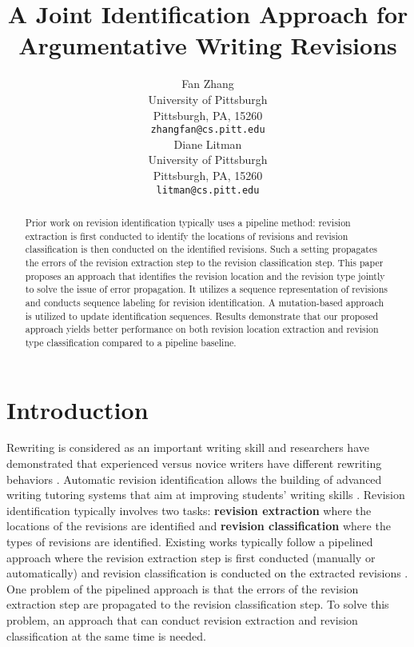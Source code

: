 \documentclass[11pt]{article}
\title{A Joint Identification Approach for Argumentative Writing Revisions}
\author{Fan Zhang \\
  University of Pittsburgh  \\
   Pittsburgh, PA, 15260 \\
  {\tt zhangfan@cs.pitt.edu} \\\And
  Diane Litman \\
  University of Pittsburgh  \\
   Pittsburgh, PA, 15260 \\
  {\tt litman@cs.pitt.edu} \\}
\date{}
\begin{document}
\maketitle
\begin{abstract}
 Prior work on revision identification typically uses a pipeline method: revision extraction is first conducted to identify the locations of revisions and revision classification is then conducted on the identified revisions. Such a setting propagates the errors of the revision extraction step to the revision classification step. This paper proposes an approach that identifies the revision location and the revision type jointly to solve the issue of error propagation. It utilizes a sequence representation of revisions and conducts sequence labeling for revision identification. A mutation-based approach is utilized to update identification sequences. Results demonstrate that our proposed approach yields better performance on both revision location extraction and revision type classification compared to a pipeline baseline. 
\end{abstract}

\section{Introduction}
\label{intro}

Rewriting is considered as an important writing skill and researchers have demonstrated that experienced versus novice writers have different rewriting behaviors \cite{faigley1981analyzing}. Automatic revision identification allows the building of advanced writing tutoring systems that aim at improving students' writing skills \cite{roscoe2015automated,zhang-EtAl:2016:N16-3}. Revision identification typically involves two tasks: \textbf{revision extraction} where the locations of the revisions are identified and \textbf{revision classification} where the types of revisions are identified. Existing works typically follow a pipelined approach where the revision extraction step is first conducted (manually or automatically) and revision classification is conducted on the extracted revisions \cite{adler2011wikipedia,daxenberger2013automatically,bronner2012user,zhang-litman:2015:bea}. One problem of the pipelined approach is that the errors of the revision extraction step are propagated to the revision classification step. To solve this problem, an approach that can conduct revision extraction and revision classification at the same time is needed. 
\end{document}
